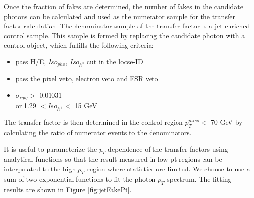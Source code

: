 \documentclass[thesis.tex]{subfiles}
\renewcommand\_{\textunderscore\allowbreak}
\begin{document}
Once the fraction of fakes are determined, the number of fakes in the candidate photons can be calculated and used as the numerator sample for the transfer factor calculation. The denominator sample of the transfer factor is a jet-enriched control sample. This sample is formed by replacing the candidate photon with a control object, which fulfills the following  criteria:
\begin{center}
\begin{itemize}
\item pass H/E, $Iso_{pho}$, $Iso_{h^0}$ cut in the loose-ID
\item pass the pixel veto, electron veto and FSR veto
\item $\sigma_{i\eta i\eta} >$ 0.01031 \\
     or   1.29 $< Iso_{h^\pm} <$ 15 GeV
\end{itemize}
\end{center}

The transfer factor is then determined in the control region $p_{T}^{miss} <$ 70 GeV by calculating the ratio of numerator events to the denominators.

It is useful to parameterize the $p_T$ dependence of the transfer factors using analytical functions so that the result measured in low pt regions can be interpolated to the high $p_T$ region where statistics are limited. We choose to use a sum of two exponential functions to fit the photon $p_T$ spectrum. The fitting results are shown in Figure \ref{fig:jetFakePt}.
\end{document}

